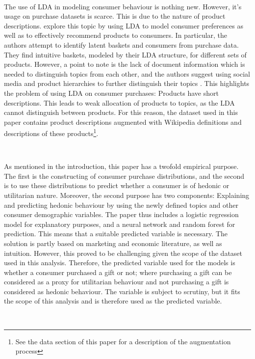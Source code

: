 \

The use of LDA in modeling consumer behaviour is nothing new. However, it's usage on purchase datasets is scarce. This is due to the nature of product descriptions. \cite{christidis2010exploring} explore this topic by using LDA to model consumer preferences as well as to effectively recommend products to consumers. In particular, the authors attempt to identify latent baskets and consumers from purchase data. They find intuitive baskets, modeled by their LDA structure, for different sets of products. However, a point to note is the lack of document information which is needed to distinguish topics from each other, and the authors suggest using social media and product hierarchies to further distinguish their topics \citep{christidis2010exploring}. This highlights the problem of using LDA on consumer purchases: Products have short descriptions. This leads to weak allocation of products to topics, as the LDA cannot distinguish between products. For this reason, the dataset used in this paper contains product descriptions augmented with Wikipedia definitions and descriptions of these products\footnote{See the data section of this paper for a description of the augmentation process}.   

\

As mentioned in the introduction, this paper has a twofold empirical purpose. The first is the constructing of consumer purchase distributions, and the second is to use these distributions to predict whether a consumer is of hedonic or utilitarian nature. Moreover, the second purpose has two components: Explaining and predicting hedonic behaviour by using the newly defined topics and other consumer demographic variables. The paper thus includes a logistic regression model for explanatory purposes, and a neural network and random forest for prediction. This means that a suitable predicted variable is necessary. The solution is partly based on marketing and economic literature, as well as intuition. However, this proved to be challenging given the scope of the dataset used in this analysis. Therefore, the predicted variable used for the models is whether a consumer purchased a gift or not; where purchasing a gift can be considered as a proxy for utilitarian behaviour and not purchasing a gift is considered as hedonic behaviour. The variable is subject to scrutiny, but it fits the scope of this analysis and is therefore used as the predicted variable. 

\

